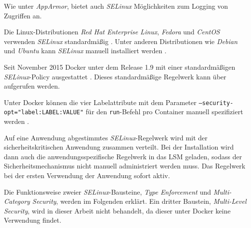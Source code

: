 \documentclass[../main.tex]{subfiles}
\begin{document}
				Wie unter \emph{AppArmor}, bietet auch \emph{SELinux} Möglichkeiten zum Logging von Zugriffen an.

				Die Linux-Distributionen \emph{Red Hat Enterprise Linux}, \emph{Fedora} und \emph{CentOS} verwenden \emph{SELinux} standardmäßig \cite{dockerSecurity}. Unter anderen Distributionen wie \emph{Debian} und \emph{Ubuntu} kann \emph{SELinux} manuell installiert werden \cite{selinuxDebian}\cite{selinuxUbuntu}.

				Seit November 2015 Docker unter dem Release 1.9 mit einer standardmäßigen \emph{SELinux}-Policy ausgestattet \cite{githubDockerChangelog}\cite{githubSELinuxPolicyIssue}.
				 Dieses standardmäßige Regelwerk kann über \cite{githubSELinuxProfile} aufgerufen werden.

				Unter Docker können die vier Labelattribute mit dem Parameter \texttt{--security-opt="{}label:LABEL:VALUE"{}} für den \texttt{run}-Befehl pro Container manuell spezifiziert werden \cite{dockerRun}.



				Auf eine Anwendung abgestimmtes \emph{SELinux}-Regelwerk wird mit der sicherheitskritischen Anwendung zusammen verteilt. Bei der Installation wird dann auch die anwendungsspezifische Regelwerk in das LSM geladen, sodass der Sicherheitsmechanismus nicht manuell administriert werden muss. Das Regelwerk bei der ersten Verwendung der Anwendung sofort aktiv.

				Die Funktionsweise zweier \emph{SELinux}-Bausteine, \emph{Type Enforcement} und \emph{Multi-Category Security}, werden im Folgenden erklärt. Ein dritter Baustein, \emph{Multi-Level Security}, wird in dieser Arbeit nicht behandelt, da dieser unter Docker keine Verwendung findet.


\end{document}
